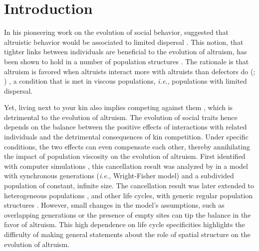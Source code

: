 \documentclass[11pt, letterpaper]{article}
\newcommand{\ie}{\textit{i.e.}}
\newcommand{\eg}{\textit{e.g.}}
\begin{document}





\doublespacing
\section*{Introduction}%
In his pioneering work on the evolution of social behavior, \citeauthor{Hamilton1964} suggested that altruistic behavior would be associated to limited dispersal \citep[p.~10]{Hamilton1964}. This notion, that tighter links between individuals are beneficial to the evolution of altruism, has been shown to hold in a number of population structures  \citep[see \eg][]{Ohtsuki2006, TaylorDayWild2007, Lehmann2007, Allen2017}. The rationale is that altruism is favored when altruists interact more with altruists than defectors do (\citealp[p.~141]{Hamilton1975}; \citealp{Fletcher2009})%
, a condition that is met in viscous populations, \ie, populations with limited dispersal.

Yet, living next to your kin also implies competing against them \citep{West2002}, which is detrimental to the evolution of altruism. The evolution of social traits hence depends on the balance between the positive effects of interactions with related individuals and the detrimental consequences of kin competition. Under specific conditions, the two effects can even compensate each other, thereby annihilating the impact of population viscosity on the evolution of altruism. 
First identified with computer simulations \citep{Wilson1992}, this cancellation result was analyzed by \citet{Taylor1992islandmodel} in a model with synchronous generations (\ie, Wright-Fisher model) and a subdivided population of constant, infinite size. The cancellation result was later extended to heterogeneous populations \citep[][with synchronous generations and infinite population size]{RodriguesGardner2012}, and other life cycles, with generic regular population structures \citep[][with synchronous generations but also with continuous generations and Birth-Death updating]{Taylor2011}. However, small changes in the model's assumptions, such as overlapping generations \citep{TaylorIrwin2000} or the presence of empty sites \citep{Alizon2008} can tip the balance in the favor of altruism. 
This high dependence on life cycle specificities highlights the difficulty of making general statements about the role of spatial structure on the evolution of altruism. 
\end{document}
